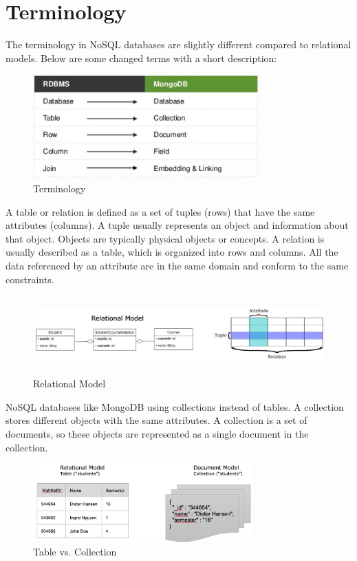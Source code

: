\documentclass[11pt]{article}
\begin{document}
\section{Terminology}
The terminology in NoSQL databases are slightly different compared to relational models. Below are some changed terms with a short description: 

	\begin{figure}[H]
		\centering 
		\includegraphics[height=4cm]{figures/terminology}     
		\caption{Terminology}          
	\end{figure}   


A table or relation is defined as a set of tuples (rows) that have the same attributes (columns). A tuple usually represents an object and information about that object. Objects are typically physical objects or concepts. A relation is usually described as a table, which is organized into rows and columns. All the data referenced by an attribute are in the same domain and conform to the same constraints. 


	\begin{figure}[H]
		\centering 
		\includegraphics[height=3cm]{figures/relational-model}     
		\caption{Relational Model}          
	\end{figure}   


\cleardoublepage

NoSQL databases like MongoDB using collections instead of tables. A collection stores different objects with the same attributes. A collection is a set of documents, so these objects are represented as a single document in the collection.

	\begin{figure}[H]
		\centering 
		\includegraphics[height=3cm]{figures/relational-document}     
		\caption{Table vs. Collection}           
	\end{figure}   
\end{document}
